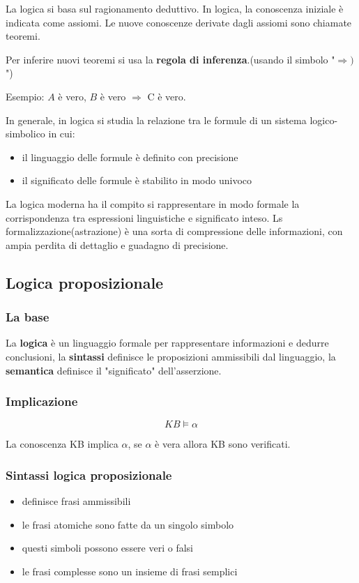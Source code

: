 La logica si basa sul ragionamento deduttivo.
In logica, la conoscenza iniziale è indicata come assiomi. Le nuove
conoscenze derivate dagli assiomi sono chiamate teoremi.

Per inferire nuovi teoremi si usa la \textbf{regola di inferenza}.(usando il simbolo "$\Rightarrow)$")

Esempio:
$A$ è vero, $B$ è vero $\Rightarrow$ C è vero.

In generale, in logica si studia la relazione tra le formule di un sistema logico-simbolico
in cui:
\begin{itemize}
    \item il linguaggio delle formule è definito con precisione
    \item il significato delle formule è stabilito in modo univoco
\end{itemize}

La logica moderna ha il compito si rappresentare in modo formale la corrispondenza tra espressioni
linguistiche e significato inteso.
Ls formalizzazione(astrazione) è una sorta di compressione delle informazioni, con ampia
perdita di dettaglio e guadagno di precisione.

\subsection{Logica proposizionale}
\subsubsection{La base}
La \textbf{logica} è un linguaggio formale per rappresentare informazioni e dedurre conclusioni,
la \textbf{sintassi} definisce le proposizioni ammissibili dal linguaggio,
la \textbf{semantica} definisce il "significato" dell'asserzione.

\subsubsection{Implicazione}
\begin{equation*}
    KB \models \alpha
\end{equation*}

La conoscenza KB implica $\alpha$, se $\alpha$ è vera allora KB sono verificati.


\subsubsection{Sintassi logica proposizionale}
\begin{itemize}
    \item definisce frasi ammissibili
    \item le frasi atomiche sono fatte da un singolo simbolo
    \item questi simboli possono essere veri o falsi
    \item le frasi complesse sono un insieme di frasi semplici
\end{itemize}


